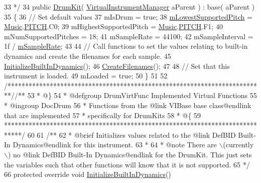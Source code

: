 \begin{DoxyCodeInclude}
33 \textcolor{comment}{    */}
34     \textcolor{keyword}{public} \hyperlink{group___drum_construct_gabade574e7f9d5684653c0b33524362a7}{DrumKit}( \hyperlink{class_virtual_instrument_manager}{VirtualInstrumentManager} aParent ) : base( aParent )
35     \{
36         \textcolor{comment}{// Set default values}
37         mIsDrum = \textcolor{keyword}{true};
38         \hyperlink{group___v_i_base_pro_var_ga3cae52b1bcc0178a8a6b03c7aaf7aac8}{mLowestSupportedPitch} = \hyperlink{class_music}{Music}.\hyperlink{group___music_enums_ga508f69b199ea518f935486c990edac1d}{PITCH}.C0;
39         mHighestSupportedPitch = \hyperlink{class_music}{Music}.\hyperlink{group___music_enums_ga508f69b199ea518f935486c990edac1d}{PITCH}.F1;
40         mNumSupportedPitches = 18;
41         mSampleRate = 44100;
42         mSampleInterval = 1f / \hyperlink{group___v_i_base_pro_var_ga80b3d2ff29b27698eea6bcf2f8ddc5d7}{mSampleRate};
43 
44         \textcolor{comment}{// Call functions to set the values relating to built-in dynamics and create the filenames for each
       sample.}
45         \hyperlink{group___drum_virt_func_gad14c6155e6ec62f26a30261e273d6379}{InitializeBuiltInDynamics}();
46         \hyperlink{group___drum_virt_func_ga25bb92cf56bc1b3434465faf73cd09cf}{CreateFilenames}();
47 
48         \textcolor{comment}{// Set that this instrument is loaded.}
49         mLoaded = \textcolor{keyword}{true};
50     \}
51 
52     \textcolor{comment}{/*************************************************************************/}\textcolor{comment}{/** }
53 \textcolor{comment}{     * @\}}
54 \textcolor{comment}{     * @defgroup DrumVirtFunc Implemented Virtual Functions}
55 \textcolor{comment}{     * @ingroup DocDrum}
56 \textcolor{comment}{     * Functions from the @link VIBase base class@endlink that are implemented }
57 \textcolor{comment}{     * specifically for DrumKits}
58 \textcolor{comment}{     * @\{}
59 \textcolor{comment}{    *****************************************************************************/}
60 \textcolor{comment}{}
61 \textcolor{comment}{    /**}
62 \textcolor{comment}{     * @brief Initializes values related to the @link DefBID Built-In Dynamics@endlink for this instrument.}
63 \textcolor{comment}{     * }
64 \textcolor{comment}{     * @note There are \(\backslash\)(currently\(\backslash\)) no @link DefBID Built-In Dynamics@endlink for the DrumKit. This just
       sets the variables such that other functions will know that it is not supported.}
65 \textcolor{comment}{    */}
66     \textcolor{keyword}{protected} \textcolor{keyword}{override} \textcolor{keywordtype}{void} \hyperlink{group___drum_virt_func_gad14c6155e6ec62f26a30261e273d6379}{InitializeBuiltInDynamics}()

\end{DoxyCodeInclude}
